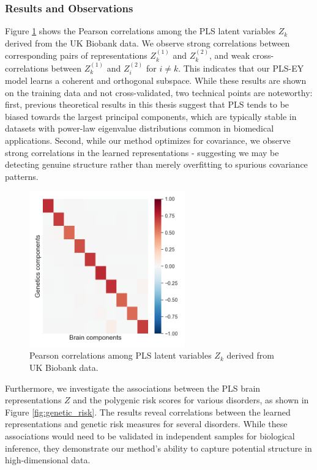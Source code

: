 \subsubsection{Results and Observations}
Figure \ref{fig:UKBB_corr} shows the Pearson correlations among the PLS latent variables $Z_k$ derived from the UK Biobank data. We observe strong correlations between corresponding pairs of representations $Z^{(1)}_k$ and $Z^{(2)}_k$, and weak cross-correlations between $Z^{(1)}_k$ and $Z^{(2)}_i$ for $i \neq k$. This indicates that our PLS-EY model learns a coherent and orthogonal subspace. While these results are shown on the training data and not cross-validated, two technical points are noteworthy: first, previous theoretical results in this thesis suggest that PLS tends to be biased towards the largest principal components, which are typically stable in datasets with power-law eigenvalue distributions common in biomedical applications. Second, while our method optimizes for covariance, we observe strong correlations in the learned representations - suggesting we may be detecting genuine structure rather than merely overfitting to spurious covariance patterns.

\begin{figure}
    \centering
    \includegraphics[width=0.6\textwidth,trim={0.8cm 0cm 0.3cm 0cm}]{figures/UKBB/cross_corr.png}
    \caption{Pearson correlations among PLS latent variables $Z_k$ derived from UK Biobank data.}
    \label{fig:UKBB_corr}
    \end{figure}

Furthermore, we investigate the associations between the PLS brain representations $Z$ and the polygenic risk scores for various disorders, as shown in Figure \ref{fig:genetic_risk}. The results reveal correlations between the learned representations and genetic risk measures for several disorders. While these associations would need to be validated in independent samples for biological inference, they demonstrate our method's ability to capture potential structure in high-dimensional data.

